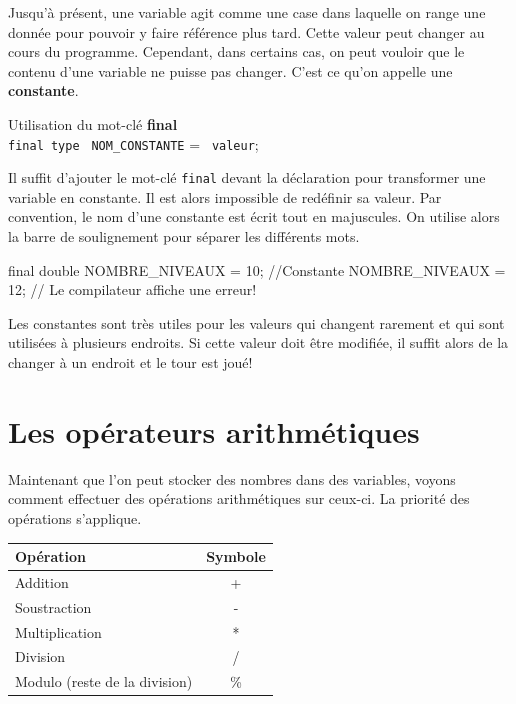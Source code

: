 \documentclass[12pt]{report}
\begin{document}
Jusqu'à présent, une variable agit comme une case dans laquelle on range une donnée pour pouvoir y faire référence plus tard. Cette valeur peut changer au cours du programme. Cependant, dans certains cas, on peut vouloir que le contenu d'une variable ne puisse pas changer. C'est ce qu'on appelle une \textbf{constante}.

%
\begin{tcolorbox}[enhanced,colframe=ultRed,
	title={Déclaration de constantes},
	sharp corners=south,
	boxsep = 1.5mm]
Utilisation du mot-clé \textbf{final}\\
\texttt{final {\color{ultRed}type}} \texttt{\color[RGB]{255, 34, 12} NOM{\_}CONSTANTE} = \texttt{\color[RGB]{63, 136, 197} valeur};%
\end{tcolorbox}

Il suffit d'ajouter le mot-clé \texttt{final} devant la déclaration pour transformer une variable en constante. Il est alors impossible de redéfinir sa valeur. Par convention, le nom d'une constante est écrit tout en majuscules. On utilise alors la barre de soulignement pour séparer les différents mots.

\begin{code}
	final double NOMBRE_NIVEAUX = 10; //Constante
NOMBRE_NIVEAUX = 12; // Le compilateur affiche une erreur!
\end{code}

Les constantes sont très utiles pour les valeurs qui changent rarement et qui sont utilisées à plusieurs endroits. Si cette valeur doit être modifiée, il suffit alors de la changer à un endroit et le tour est joué!



\section{Les opérateurs arithmétiques}

Maintenant que l'on peut stocker des nombres dans des variables, voyons comment effectuer des opérations arithmétiques sur ceux-ci. La priorité des opérations s'applique.

\begin{center}
\begin{tabularx}{0.5\linewidth}{X c} \toprule
\textbf{Opération} & \textbf{Symbole} \\ \midrule
Addition & + \\
Soustraction & - \\
Multiplication & * \\
Division & / \\
Modulo {\footnotesize (reste de la division)} & \% \\ \bottomrule
\end{tabularx}
\end{center}
\end{document}
